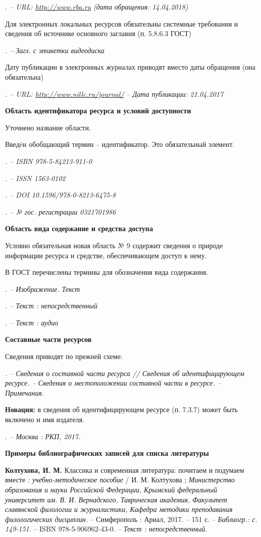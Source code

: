 \textsl{. -- URL: \underline{http://www.rba.ru} (дата обращения: 14.04.2018)}

Для электронных локальных ресурсов обязательны системные требования и сведения об источнике основного заглавия (п. 5.8.6.3 ГОСТ)

\textsl{. -- Загл. с этикетки видеодиска}

Дату публикации в электронных журналах приводят вместо даты обращения (она обязательна)

\textsl{. -- URL: \underline{http://www.nillc.ru/journal/} -- Дата публикации: 21.04.2017}

\textbf{Область идентификатора ресурса и условий доступности}

Уточнено название области.

Введ\"eн обобщающий термин -- идентификатор. Это обязательный элемент.

\textsl{. -- ISBN 978-5-84213-911-0}

\textsl{. -- ISSN 1563-0102}

\textsl{. -- DOI 10.1596/978-0-8213-6475-8}

\textsl{. -- № гос. регистрации 0321701986}

\textbf{Область вида содержание и средства доступа}

Условно обязательная новая область № 9 содержит сведения о природе информации ресурса и средстве, обеспечивающем доступ к нему.

В ГОСТ перечислены термины для обозначения вида содержания.

\textsl{. -- Изображение. Текст}

\textsl{. -- Текст : непосредственный}

\textsl{. -- Текст : аудио}

\textbf{Составные части ресурсов}

Сведения приводят по прежней схеме:

\textsl{. -- Сведения о составной части ресурса // Сведения об идентифицирующем ресурсе. -- Сведения о местоположении составной части в ресурсе. -- Примечания.}

\textbf{Новация:} в сведения об идентифицирующем ресурсе (п. 7.3.7) может быть включено и имя издателя.

\textsl{. -- Москва : РКП, 2017.}

\textbf{Примеры библиографических записей для списка литературы}

\textbf{Колтухова, И. М.} Классика и современная литература: почитаем и подумаем вместе \textit{: учебно-методическое пособие} / И. М. Колтухова ; \textit{Министерство образования и науки Российской Федерации, Крымский федеральный университет им. В. И. Вернадского, Таврическая академия, Факультет славянской филологии и журналистики, Кафедра методики преподавания филологических дисциплин.} -- Симферополь : Ариал, 2017. -- 151 с. -- \textit{Библиогр.: с. 149-151.} -- ISBN 978-5-906962-43-0. -- \textit{Текст : непосредственный}.

